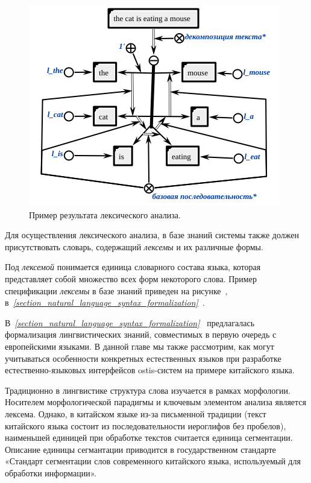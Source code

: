 \begin{figure}[h]
    \centering
    \includegraphics[scale=0.8]{images/part4/chapter_nl_interfaces/lexical}
    \caption{Пример результата лексического анализа.}
    \label{fig:lexical_result}
\end{figure}

Для осуществления лексического анализа, в базе знаний системы также должен присутствовать словарь, содержащий \textit{лексемы} и их различные формы.

Под \textit{лексемой} понимается единица словарного состава языка, которая представляет собой множество всех форм некоторого слова.
Пример спецификации \textit{лексемы} в базе знаний приведен на рисунке~\textit{}, в~\textit{\ref{section_natural_language_syntax_formalization}~}.

В~\textit{\ref{section_natural_language_syntax_formalization}~} предлагалась формализация лингвистических знаний, совместимых в первую очередь с европейскими языками.
В данной главе мы также рассмотрим, как могут учитываться особенности конкретных естественных языков при разработке естественно-языковых интерфейсов ostis-систем на примере китайского языка.

Традиционно в лингвистике структура слова изучается в рамках морфологии.
Носителем морфологической парадигмы и ключевым элементом анализа является лексема.
Однако, в китайском языке из-за письменной традиции (текст китайского языка состоит из последовательности иероглифов без пробелов), наименьшей единицей при обработке текстов считается единица сегментации.
Описание единицы сегмантации приводится в государственном стандарте «Стандарт сегментации слов современного китайского языка, используемый для обработки информации».
\begin{SCn}
\end{SCn}

